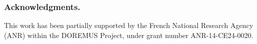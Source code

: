 \documentclass{llncs}
\begin{document}

\subsubsection*{Acknowledgments.}
This work has been partially supported by the French National Research Agency (ANR) within the DOREMUS Project, under grant number ANR-14-CE24-0020.




\newpage
\end{document}
